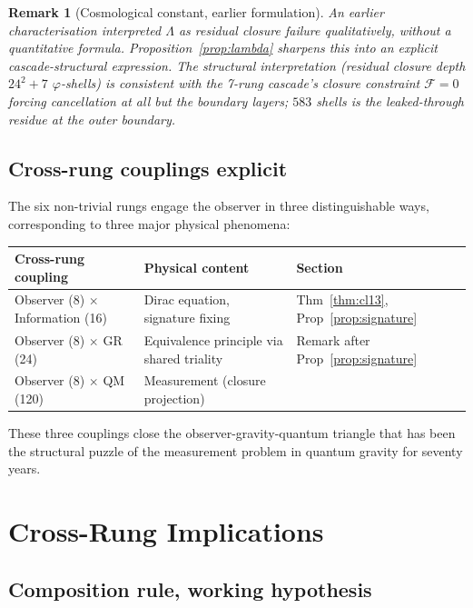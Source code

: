 \documentclass[12pt]{article}
\newtheorem{remark}[theorem]{Remark}
\newcommand{\Fcal}{\mathcal{F}}
\begin{document}
\begin{remark}[Cosmological constant, earlier formulation]
An earlier characterisation interpreted $\Lambda$ as residual closure failure qualitatively, without a quantitative formula. Proposition~\ref{prop:lambda} sharpens this into an explicit cascade-structural expression. The structural interpretation (residual closure depth $24^2 + 7$ $\varphi$-shells) is consistent with the 7-rung cascade's closure constraint $\Fcal = 0$ forcing cancellation at all but the boundary layers; $583$ shells is the leaked-through residue at the outer boundary.
\end{remark}

\subsection{Cross-rung couplings explicit}\label{sec:lower:triangle}

The six non-trivial rungs engage the observer in three distinguishable ways, corresponding to three major physical phenomena:

\begin{center}
\begin{tabular}{l|l|l}
\toprule
Cross-rung coupling & Physical content & Section \\
\midrule
Observer (8) $\times$ Information (16) & Dirac equation, signature fixing & Thm~\ref{thm:cl13}, Prop~\ref{prop:signature} \\
Observer (8) $\times$ GR (24) & Equivalence principle via shared triality & Remark after Prop~\ref{prop:signature} \\
Observer (8) $\times$ QM (120) & Measurement (closure projection) & \citep{SmartXXXIII} \\
\bottomrule
\end{tabular}
\end{center}

These three couplings close the observer-gravity-quantum triangle that has been the structural puzzle of the measurement problem in quantum gravity for seventy years.

\section{Cross-Rung Implications}\label{sec:cross}

\subsection{Composition rule, working hypothesis}
\end{document}
